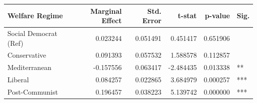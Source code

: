 \begin{tabular}{lrrrrl}
\toprule
Welfare Regime & Marginal Effect & Std. Error & t-stat & p-value & Sig. \\
\midrule
Social Democrat (Ref) & 0.023244 & 0.051491 & 0.451417 & 0.651906 &  \\
Conservative & 0.091393 & 0.057532 & 1.588578 & 0.112857 &  \\
Mediterranean & -0.157556 & 0.063417 & -2.484435 & 0.013338 & ** \\
Liberal & 0.084257 & 0.022865 & 3.684979 & 0.000257 & *** \\
Post-Communist & 0.196457 & 0.038223 & 5.139742 & 0.000000 & *** \\
\bottomrule
\end{tabular}
